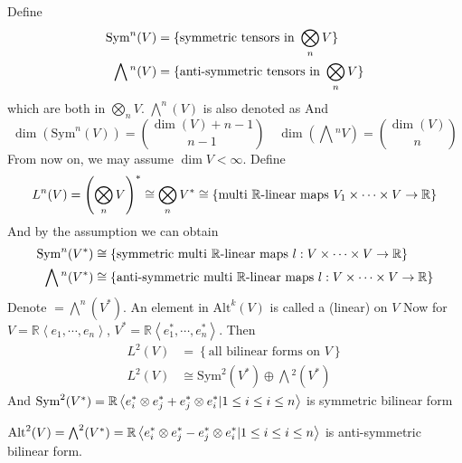 Define 
\begin{equation}
    \begin{aligned}
        \name{$ \mathrm{Sym}^n(V) $}&=\{\text{symmetric tensors in }\bigotimes_n V\}\\
        \name{$ \bigwedge{}^n(V) $}&=\{\text{anti-symmetric tensors in }\bigotimes_n V\}
    \end{aligned}
\end{equation}
which are both in  $ \bigotimes\limits_nV $.  $ \bigwedge^n(V) $ is also denoted as     And
\begin{equation}
    \dim (\mathrm{Sym}^n(V))=\binom{\dim(V)+n-1}{n-1}\quad\dim(\bigwedge{}^n  V)=\binom{\dim(V)}{n}
\end{equation}
From now on, we may assume  $ \dim V<\infty $. Define 
\begin{equation}
    \name{$ L^n(V) $}=\left(\bigotimes\limits_n V\right)^*\cong \bigotimes_n V^*\cong \left\{\text{multi  $ \mathbb{R} $-linear maps }V_1\times \cdots\times V\rightarrow \mathbb{R}\right\}
\end{equation} 
And by the assumption we can obtain
\begin{equation}
    \begin{aligned}
        \mathrm{Sym}^n(V^*)&\cong\{\text{symmetric multi  $ \mathbb{R} $-linear maps }l:V\times \cdots \times V\rightarrow \mathbb{R}\}\\
        \bigwedge{}^n(V^*)&\cong \{\text{anti-symmetric multi  $ \mathbb{R} $-linear maps }l:V\times \cdots \times V\rightarrow \mathbb{R}\}
    \end{aligned}
\end{equation}
Denote  $=\bigwedge^n(V^*)  $.  
An element in  $ \mathrm{Alt}^k(V) $ is called a (linear)  on  $ V $ 
Now for  $ V=\mathbb{R}\left<e_1,\cdots,e_n\right> $,  $ V^*=\mathbb{R}\left<e_1^*,\cdots,e_n^*\right> $. Then 
\begin{align*}
    L^2(V)&=\left\{\text{all bilinear forms on }V\right\}\\  
    L^2(V)&\cong \mathrm{Sym}^2(V^*)\oplus \bigwedge{}^2(V^*)
\end{align*}
And  $ \mathrm{Sym}^2(V^*)=\displaystyle\mathbb{R}\left<e_i^*\otimes e_j^*+e_j^*\otimes e_i^*|1 \leq i \leq i \leq n \right> $ is symmetric bilinear form

$ \mathrm{Alt}^2(V)=\bigwedge^2(V^*)=\displaystyle\mathbb{R}\left<e_i^*\otimes e_j^*-e_j^*\otimes e_i^*|1 \leq i \leq i \leq n \right> $ is anti-symmetric bilinear form.

